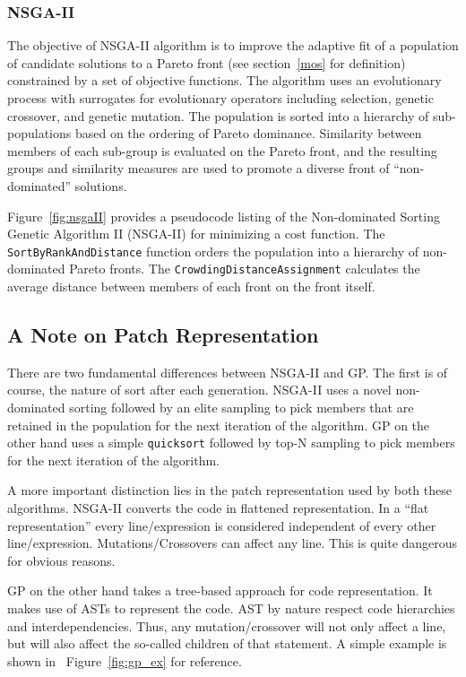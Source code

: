 \documentclass{sig-alternate}
\theoremstyle{break}
\newcommand{\fig}[1]{Figure~\ref{fig:#1}}
\begin{document}
\subsubsection{NSGA-II}

The objective of NSGA-II algorithm is to improve the adaptive fit of a population of candidate solutions to a Pareto front (see section~\ref{mos} for definition) constrained by a set of objective functions. The algorithm uses an evolutionary process with surrogates for evolutionary operators including selection, genetic crossover, and genetic mutation. The population is sorted into a hierarchy of sub-populations based on the ordering of Pareto dominance. Similarity between members of each sub-group is evaluated on the Pareto front, and the resulting groups and similarity measures are used to promote a diverse front of ``non-dominated'' solutions.


\fig{nsgaII} provides a pseudocode listing of the Non-dominated Sorting Genetic Algorithm II (NSGA-II) for minimizing a cost function. The \texttt{SortByRankAndDistance} function orders the population into a hierarchy of non-dominated Pareto fronts. The \texttt{CrowdingDistanceAssignment} calculates the average distance between members of each front on the front
itself.

\subsection{A Note on Patch Representation}
\label{patch_rep}
There are two fundamental differences between NSGA-II and GP. The first is of course, the nature of sort after each generation. NSGA-II uses a novel non-dominated sorting followed by an elite sampling to pick members that are retained in the population for the next iteration of the algorithm. GP on the other hand uses a simple \texttt{quicksort} followed by top-N sampling to pick members for the next iteration of the algorithm.

A more important distinction lies in the patch representation used by both these algorithms. NSGA-II converts the code in flattened representation. In a ``flat representation'' every line/expression is considered independent of every other line/expression. Mutations/Crossovers can affect any line. This is quite dangerous for obvious reasons. 

GP on the other hand takes a tree-based approach for code representation. It makes use of ASTs to represent the code. AST by nature respect code hierarchies and interdependencies. Thus, any mutation/crossover will not only affect a line, but will also affect the so-called children of that statement. A simple example is shown in ~\fig{gp_ex} for reference.
\end{document}
